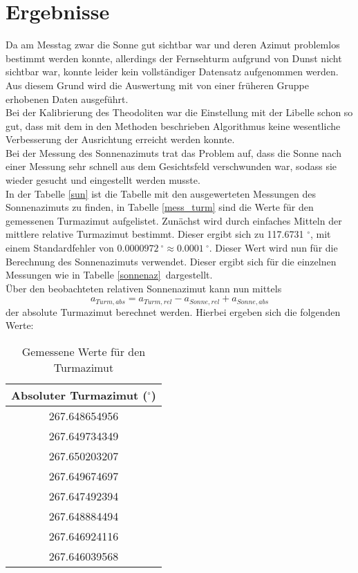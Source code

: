 \section{Ergebnisse}
Da am Messtag zwar die Sonne gut sichtbar war und deren Azimut problemlos bestimmt werden konnte, allerdings der Fernsehturm aufgrund von Dunst nicht sichtbar war, konnte leider kein vollständiger Datensatz aufgenommen werden. Aus diesem Grund wird die Auswertung mit von einer früheren Gruppe erhobenen Daten ausgeführt. \\
Bei der Kalibrierung des Theodoliten war die Einstellung mit der Libelle schon so gut, dass mit dem in den Methoden beschrieben Algorithmus keine wesentliche Verbesserung der Ausrichtung erreicht werden konnte. \\
Bei der Messung des Sonnenazimuts trat das Problem auf, dass die Sonne nach einer Messung sehr schnell aus dem Gesichtsfeld verschwunden war, sodass sie wieder gesucht und eingestellt werden musste. \\
In der Tabelle \ref{sun} ist die Tabelle mit den ausgewerteten Messungen des Sonnenazimuts zu finden, in Tabelle \ref{mess_turm} sind die Werte für den gemessenen Turmazimut aufgelistet. Zunächst wird durch einfaches Mitteln der mittlere relative Turmazimut bestimmt. Dieser ergibt sich zu 117.6731 $^\circ$, mit einem Standardfehler von $ 0.0000972 \ ^\circ \approx 0.0001 \ ^\circ$. Dieser Wert wird nun für die Berechnung des Sonnenazimuts verwendet. Dieser ergibt sich für die einzelnen Messungen wie in Tabelle \ref{sonnenaz}\ dargestellt. \\
Über den beobachteten relativen Sonnenazimut kann nun mittels 
\begin{equation}
a_{Turm,abs} = a_{Turm, rel} - a_{Sonne,rel} + a_{Sonne,abs} 
\end{equation}
der absolute Turmazimut berechnet werden. 
Hierbei ergeben sich die folgenden Werte: 
\begin{table}[h!]
\centering
\begin{tabular}{c}
Absoluter Turmazimut ($^\circ$)\\
\hline
267.648654956 \\
267.649734349 \\
267.650203207 \\
267.649674697 \\
267.647492394 \\
267.648884494 \\
267.646924116 \\
267.646039568 \\
\end{tabular}
\caption{Gemessene Werte für den Turmazimut}
\end{table}

